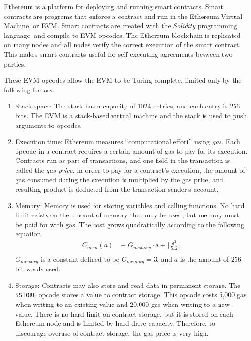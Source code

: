 \documentclass[12pt]{article}
\begin{document}
Ethereum is a platform for deploying and running smart contracts. Smart contracts are programs that enforce a contract and run in the Ethereum Virtual Machine, or EVM. Smart contracts are created with the \emph{Solidity} programming language, and compile to EVM opcodes. The Ethereum blockchain is replicated on many nodes and all nodes verify the correct execution of the smart contract. This makes smart contracts useful for self-executing agreements between two parties.

These EVM opcodes allow the EVM to be Turing complete, limited only by the following factors:
\begin{enumerate}
  \item Stack space: The stack has a capacity of 1024 entries, and each entry is 256 bits. The EVM is a stack-based virtual machine and the stack is used to push arguments to opcodes.
  \item Execution time: Ethereum measures ``computational effort'' using \emph{gas}. Each opcode in a contract requires a certain amount of gas to pay for its execution. Contracts run as part of transactions, and one field in the transaction is called the \emph{gas price}. In order to pay for a contract's execution, the amount of gas consumed during the execution is multiplied by the gas price, and resulting product is deducted from the transaction sender's account.
  \item Memory: Memory is used for storing variables and calling functions. No hard limit exists on the amount of memory that may be used, but memory must be paid for with gas. The cost grows quadratically according to the following equation.
  \begin{align*}
    C_{mem}(a) &\equiv G_{memory} \cdot a + \lfloor \frac{a^2}{512} \rfloor \\
  \end{align*}
  $G_{memory}$ is a constant defined to be $G_{memory} = 3$, and $a$ is the amount of $256$-bit words used.
  \item Storage: Contracts may also store and read data in permanent storage. The \texttt{SSTORE} opcode stores a value to contract storage. This opcode costs 5,000 gas when writing to an existing value and 20,000 gas when writing to a new value. There is no hard limit on contract storage, but it is stored on each Ethereum node and is limited by hard drive capacity. Therefore, to discourage overuse of contract storage, the gas price is very high.
\end{enumerate}
\end{document}
